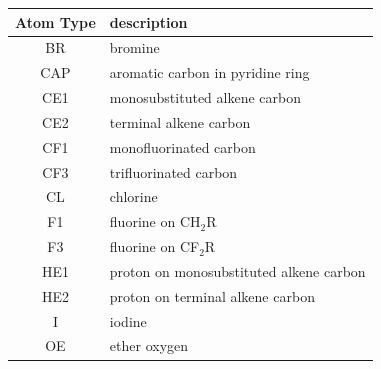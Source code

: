 \begin{table}
\begin{tabular}{c|l}
    \toprule
    Atom Type & description\\
    \midrule
    BR & bromine\\
    CAP & aromatic carbon in pyridine ring\\
    CE1 & monosubstituted alkene carbon\\
    CE2 & terminal alkene carbon\\
    CF1 & monofluorinated carbon\\
    CF3 & trifluorinated carbon\\
    CL & chlorine\\
    F1 & fluorine on CH$_2$R\\
    F3 & fluorine on CF$_2$R\\
    HE1 & proton on monosubstituted alkene carbon \\
    HE2 & proton on terminal alkene carbon\\
    I & iodine\\
    OE & ether oxygen\\
    \bottomrule
  \end{tabular}
\end{table}


